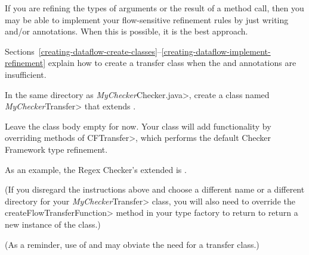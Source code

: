 If you are refining the types of arguments or the result of a method call,
then you may be able to implement your flow-sensitive refinement rules by
just writing  and/or
 annotations.
When this is possible, it is the best approach.

Sections~\ref{creating-dataflow-create-classes}--\ref{creating-dataflow-implement-refinement}
explain how to create a transfer class when the
 and
 annotations are insufficient.



In the same directory as \<\emph{MyChecker}Checker.java>, create a class
named \<\emph{MyChecker}Transfer> that extends
.

Leave the class body empty for now.  Your class will add functionality by
overriding methods of \<CFTransfer>, which performs the default Checker
Framework type refinement.

As an example, the Regex Checker's extended
 is
.

(If you disregard the instructions above and choose a different name or a
different directory for your \<\emph{MyChecker}Transfer> class, you will
also need to override the \<createFlowTransferFunction> method in your type
factory to return to return a new instance of the class.)

(As a reminder, use of  and
 may obviate the need for
a transfer class.)

%

